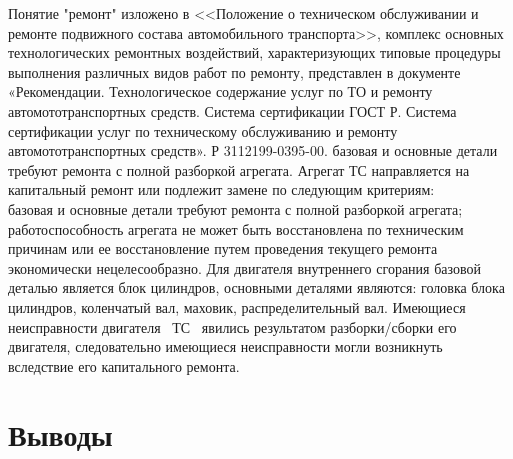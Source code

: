 
Понятие "ремонт" изложено в <<Положение о техническом обслуживании и ремонте подвижного
состава автомобильного транспорта>>, комплекс основных технологических ремонтных воздействий, характеризующих типовые процедуры выполнения различных видов работ по ремонту, представлен в документе «Рекомендации. Технологическое содержание услуг по ТО и ремонту автомототранспортных средств. Система сертификации ГОСТ Р. Система сертификации услуг по техническому обслуживанию и ремонту автомототранспортных средств». Р 3112199-0395-00. базовая и основные детали требуют ремонта с полной разборкой агрегата. Агрегат ТС направляется на капитальный ремонт или подлежит замене по следующим критериям:\\
базовая и основные детали требуют ремонта с полной разборкой агрегата;
работоспособность агрегата не может быть восстановлена по техническим причинам или ее восстановление путем проведения текущего ремонта экономически нецелесообразно.
Для двигателя внутреннего сгорания базовой деталью является блок цилиндров, основными деталями являются: головка блока цилиндров, коленчатый вал, маховик, распределительный вал.
Имеющиеся неисправности двигателя  \, ТС \, явились результатом разборки/сборки его двигателя,  следовательно имеющиеся неисправности могли возникнуть вследствие его капитального ремонта. 


\vspace{2.5mm}
\section{Выводы}

\vspace{15mm}
\relax


